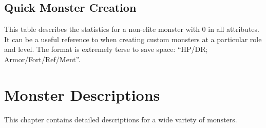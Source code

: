 \section{Quick Monster Creation}

  This table describes the statistics for a non-elite monster with 0 in all attributes.
  It can be a useful reference to when creating custom monsters at a particular role and level.
  The format is extremely terse to save space: ``HP/DR; Armor/Fort/Ref/Ment''.

  

  \chapter{Monster Descriptions}

  This chapter contains detailed descriptions for a wide variety of monsters.

  
